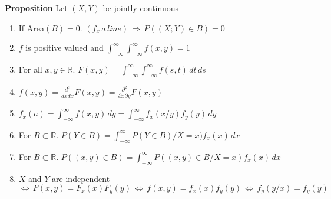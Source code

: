 \documentclass[12pt,a4paper,draft]{report}
\begin{document}
\textbf{Proposition} Let $(X,Y)$ be jointly continuous
\begin{enumerate}
\item If Area$(B)=0$. $(f_x\,a\,line)\,\Rightarrow\,P((X;Y)\in B)=0$
\item $f$ is positive valued and $\int_{-\infty}^{\infty}\!\int_{-\infty}^{\infty}\!f(x,y)=1$
\item For all $x,y\in\mathbb{R}$. $F(x,y)=\int_{-\infty}^{\infty}\!\int_{-\infty}^{\infty}\!f(s,t)\,dt\,ds$
\item $f(x,y)=\frac{d^2}{dxdx}F(x,y)=\frac{\partial^2}{\partial x\partial y}F(x,y)$
\item $f_x(a)=\int_{-\infty}^{\infty}\!f(x,y)\,dy=\int_{-\infty}^{\infty}f_x(x/y)f_y(y)\,dy$
\item For $B\subset\mathbb{R}$. $P(Y\in B)=\int_{-\infty}^{\infty}\!P(Y\in B)/X=x)f_x(x)\,dx$
\item For $B\subset\mathbb{R}$. $P((x,y)\in B)=\int_{-\infty}^{\infty}\!P((x,y)\in B/X=x)f_x(x)\,dx$
\item $X$ and $Y$ are independent $\Leftrightarrow\,F(x,y)=F_x(x)F_y(y)\,\Leftrightarrow\,f(x,y)=f_x(x)f_y(y)\,\Leftrightarrow\,f_y(y/x)=f_y(y)$
\end{enumerate}
\end{document}

